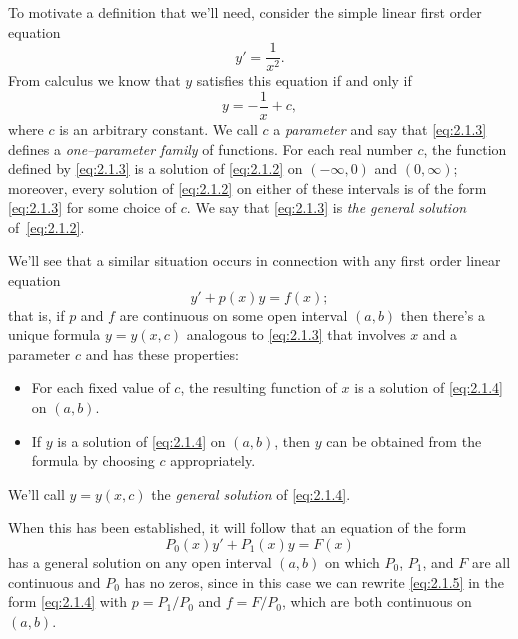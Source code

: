 
\noindent
To motivate a definition that we'll need, consider the simple linear first order equation
\begin{equation}
  \label{eq:2.1.2}y'=\frac{1}{x^{2}}.
\end{equation}
From calculus we know that $y$ satisfies this equation if and only if
\begin{equation}
  \label{eq:2.1.3}y=-\frac{1}{x}+c,
\end{equation}
where $c$ is an arbitrary constant. We call $c$ a {\color{blue}\it parameter\/} and say that
\eqref{eq:2.1.3} defines a {\color{blue}\it one--parameter family\/} of functions. For each real
number $c$, the function defined by \eqref{eq:2.1.3} is a solution of \eqref{eq:2.1.2} on
$(-\infty,0)$ and $(0,\infty)$; moreover, every solution of \eqref{eq:2.1.2} on either of these
intervals is of the form \eqref{eq:2.1.3} for some choice of $c$. We say that \eqref{eq:2.1.3} is
{\color{blue}\it the general solution\/} of~\eqref{eq:2.1.2}.

We'll see that a similar situation occurs in connection with any first order linear equation
\begin{equation}
  \label{eq:2.1.4}y'+p(x)y=f(x);
\end{equation}
that is, if $p$ and $f$ are continuous on some open interval $(a,b)$ then there's a unique formula
$y=y(x,c)$ analogous to \eqref{eq:2.1.3} that involves $x$ and a parameter $c$ and has these
properties:
\begin{itemize}
  \item %
    For each fixed value of $c$, the resulting function of $x$ is a solution of \eqref{eq:2.1.4} on
    $(a,b)$.

  \item %
    If $y$ is a solution of \eqref{eq:2.1.4} on $(a,b)$, then $y$ can be obtained from the formula
    by choosing $c$ appropriately.
\end{itemize}
We'll call $y=y(x,c)$ the {\color{blue}\it general solution\/} of \eqref{eq:2.1.4}.

When this has been established, it will follow that an equation of the form
\begin{equation}
  \label{eq:2.1.5}P_{0}(x)y'+P_{1}(x)y=F(x)
\end{equation}
has a general solution on any open interval $(a,b)$ on which $P_{0}$, $P_{1}$, and $F$ are all
continuous and $P_{0}$ has no zeros, since in this case we can rewrite \eqref{eq:2.1.5} in the form
\eqref{eq:2.1.4} with $p=P_{1}/P_{0}$ and $f=F/P_{0}$, which are both continuous on $(a,b)$.


